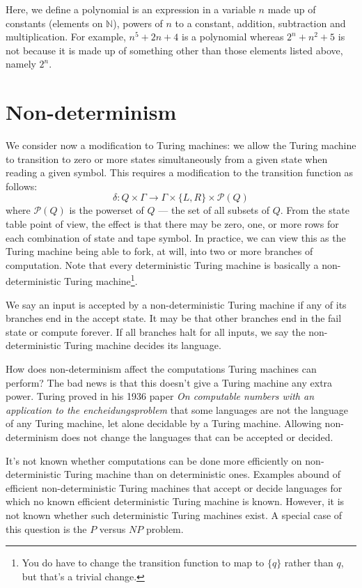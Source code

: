   Here, we define a polynomial is an expression in a variable \( n \) made up of constants (elements on \( \mathbb{N}\)), powers of \( n \) to a constant, addition, subtraction and multiplication.
  For example, \( n^5 + 2n + 4 \) is a polynomial whereas \( 2^n + n^2 + 5 \) is not because it is made up of something other than those elements listed above, namely \( 2^n \).

\section{Non-determinism}
  \label{sect:nondet}
  We consider now a modification to Turing machines: we allow the Turing machine to transition to zero or more states simultaneously from a given state when reading a given symbol.
  This requires a modification to the transition function as follows:
   \[ \delta: Q \times \Gamma \rightarrow \Gamma \times \{ L, R \} \times \mathcal{P}(Q) \]
   where \( \mathcal{P}(Q) \) is the powerset of \( Q \) --- the set of all subsets of \( Q \).
  From the state table point of view, the effect is that there may be zero, one, or more rows for each combination of state and tape symbol.
  In practice, we can view this as the Turing machine being able to fork, at will, into two or more branches of computation.
  Note that every deterministic Turing machine is basically a non-deterministic Turing machine\footnote{You do have to change the transition function to map to \( \{ q \} \) rather than \( q \), but that's a trivial change.}.

  We say an input is accepted by a non-deterministic Turing machine if any of its branches end in the accept state.
  It may be that other branches end in the fail state or compute forever.
  If all branches halt for all inputs, we say the non-deterministic Turing machine decides its language.

  How does non-determinism affect the computations Turing machines can perform?
  The bad news is that this doesn't give a Turing machine any extra power.
  Turing proved in his 1936 paper \emph{On computable numbers with an application to the encheidungsproblem} that some languages are not the language of any Turing machine, let alone decidable by a Turing machine.
  Allowing non-determinism does not change the languages that can be accepted or decided.

  It's not known whether computations can be done more efficiently on non-deterministic Turing machine than on deterministic ones.
  Examples abound of efficient non-deterministic Turing machines that accept or decide languages for which no known efficient deterministic Turing machine is known.
  However, it is not known whether such deterministic Turing machines exist.
  A special case of this question is the \( P \) versus \( NP \) problem.


